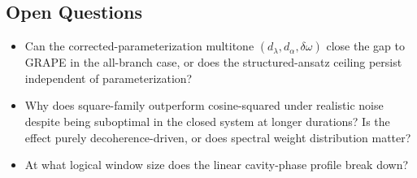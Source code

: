 \documentclass[aps,pra,twocolumn,reprint,amsmath,amssymb]{revtex4-2}
\begin{document}
\subsection{Open Questions}
\begin{itemize}
\item Can the corrected-parameterization multitone $(d_\lambda, d_\alpha, \delta\omega)$ close the gap to GRAPE in the all-branch case, or does the structured-ansatz ceiling persist independent of parameterization?
\item Why does square-family outperform cosine-squared under realistic noise despite being suboptimal in the closed system at longer durations? Is the effect purely decoherence-driven, or does spectral weight distribution matter?
\item At what logical window size does the linear cavity-phase profile break down?
\end{itemize}



\end{document}

